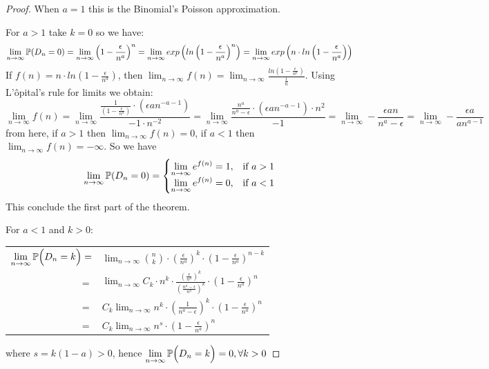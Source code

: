 \begin{proof}
When $a=1$ this is the Binomial's Poisson approximation.

For $a>1$ take $k=0$ so we have:
$$\displaystyle\lim_{n\to \infty} \P(D_n = 0) = \displaystyle\lim_{n\to \infty } \left( 1 - \frac{\epsilon}{n^a}\right)^n = \displaystyle\lim_{n\to \infty} exp\left( ln \left( 1 - \frac{\epsilon}{n^a}\right)^n\right) = \displaystyle\lim_{n\to \infty} exp\left(n \cdot ln \left( 1 - \frac{\epsilon}{n^a}\right)\right)$$
If $f(n)=  n \cdot ln \left( 1 - \frac{\epsilon}{n^a}\right)$, then $\displaystyle\lim_{n\to \infty} f(n) = \displaystyle\lim_{n\to \infty}\frac{ln \left( 1 - \frac{\epsilon}{n^a}\right)}{\frac{1}{n}}$. Using L'ôpital's rule for limits we obtain:
$$\displaystyle\lim_{n\to \infty } f(n) = 
\displaystyle\lim_{n\to \infty } \frac{\frac{1}{\left( 1 - \frac{\epsilon}{n^a}\right)}\cdot (\epsilon a n^{-a-1})}
{-1\cdot n^{-2}} = 
\displaystyle\lim_{n\to \infty } \frac{\frac{n^a}{n^{a} - \epsilon}\cdot (\epsilon a n^{-a-1}) \cdot {n^{2}}}{-1} = 
\displaystyle\lim_{n\to \infty } - \frac{\epsilon a n}{n^{a} - \epsilon} =
\displaystyle\lim_{n\to \infty } - \frac{\epsilon a}{a n^{a-1}}
$$
from here, if $a>1$ then $\displaystyle\lim_{n\to \infty } f(n) = 0$, if $a<1$ then $\displaystyle\lim_{n\to \infty } f(n) = -\infty$. So we have
$$ \displaystyle\lim_{n\to \infty} \P(D_n=0) = \begin{cases} 
\displaystyle\lim_{n\to \infty}e^{f(n)} = 1, & \mbox{if } a>1 \\ 
\displaystyle\lim_{n\to \infty}e^{f(n)} = 0, & \mbox{if } a<1 \end{cases} $$
This conclude the first part of the theorem. 

For $a<1$ and $k>0$:
\begin{center}
\begin{tabular}{ r l }
 $\displaystyle\lim_{n\to \infty } \P\Big(D_n=k\Big) =$ & $\displaystyle\lim_{n\to \infty} \binom{n}{k} \cdot \left( \frac{\epsilon}{n^a} \right)^k \cdot \left( 1-\frac{\epsilon}{n^a}\right)^{n-k}$ \\
$=$ &  $\displaystyle\lim_{n\to \infty} C_{k}\cdot n^k\cdot  \frac{\left(\frac{\epsilon}{n^a}\right)^k} {\left(\frac{n^a - \epsilon}{n^a}\right)^k} \cdot \left(1-\frac{\epsilon}{n^a}\right)^{n} $\\
$=$ &  $C_{k}\displaystyle\lim_{n\to \infty} n^k \cdot \left(\frac{1} {n^a - \epsilon}\right)^k \cdot \left(1-\frac{\epsilon}{n^a}\right)^{n} $\\
$=$ &  $C_{k} \displaystyle\lim_{n\to \infty}  n^s\cdot \left(1-\frac{\epsilon}{n^a}\right)^{n}$\\
\end{tabular}
\end{center}

where $s=k(1-a)>0$, hence $\displaystyle\lim_{n\to \infty } \P\Big(D_n=k\Big) = 0, \forall k>0$ 

\end{proof}

